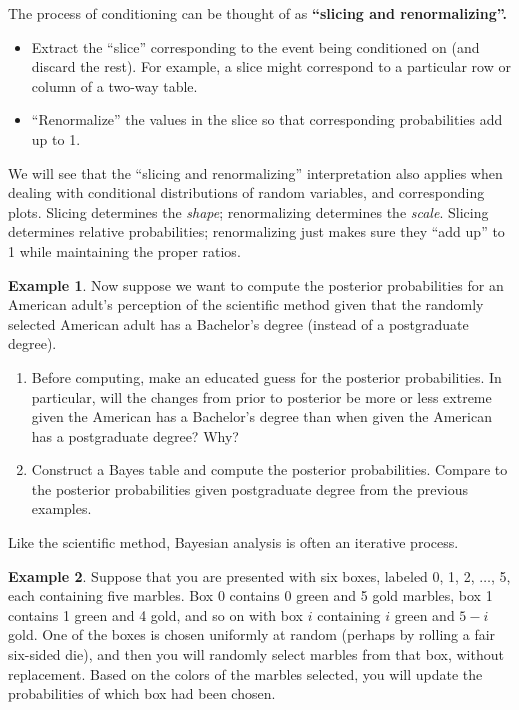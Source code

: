 \documentclass[
]{book}
\providecommand{\tightlist}{%
  \setlength{\itemsep}{0pt}\setlength{\parskip}{0pt}}
\theoremstyle{definition}
\theoremstyle{definition}
\newtheorem{example}{Example}[chapter]
\theoremstyle{definition}
\theoremstyle{remark}
\begin{document}
The process of conditioning can be thought of as \textbf{``slicing and renormalizing''.}

\begin{itemize}
\tightlist
\item
  Extract the ``slice'' corresponding to the event being conditioned on (and discard the rest). For example, a slice might correspond to a particular row or column of a two-way table.\\
\item
  ``Renormalize'' the values in the slice so that corresponding probabilities add up to 1.
\end{itemize}

We will see that the ``slicing and renormalizing'' interpretation also applies when dealing with conditional distributions of random variables, and corresponding plots. Slicing determines the \emph{shape}; renormalizing determines the \emph{scale}. Slicing determines relative probabilities; renormalizing just makes sure they ``add up'' to 1 while maintaining the proper ratios.

\begin{example}
\protect\hypertarget{exm:unnamed-chunk-21}{}{\label{exm:unnamed-chunk-21} }Now suppose we want to compute the posterior probabilities for an American adult's perception of the scientific method given that the randomly selected American adult has a Bachelor's degree (instead of a postgraduate degree).
\end{example}

\begin{enumerate}
\def\labelenumi{\arabic{enumi}.}
\tightlist
\item
  Before computing, make an educated guess for the posterior probabilities. In particular, will the changes from prior to posterior be more or less extreme given the American has a Bachelor's degree than when given the American has a postgraduate degree? Why?
\item
  Construct a Bayes table and compute the posterior probabilities. Compare to the posterior probabilities given postgraduate degree from the previous examples.
\end{enumerate}

Like the scientific method, Bayesian analysis is often an iterative process.

\begin{example}
\protect\hypertarget{exm:bayes-marbles}{}{\label{exm:bayes-marbles} }
Suppose that you are presented with six boxes, labeled 0, 1, 2, \(\ldots\), 5, each containing five marbles.
Box 0 contains 0 green and 5 gold marbles, box 1 contains 1 green and 4 gold, and so on with box \(i\) containing \(i\) green and \(5-i\) gold.
One of the boxes is chosen uniformly at random (perhaps by rolling a fair six-sided die), and then you will randomly select marbles from that box, without replacement.
Based on the colors of the marbles selected, you will update the probabilities of which box had been chosen.
\end{example}
\end{document}
